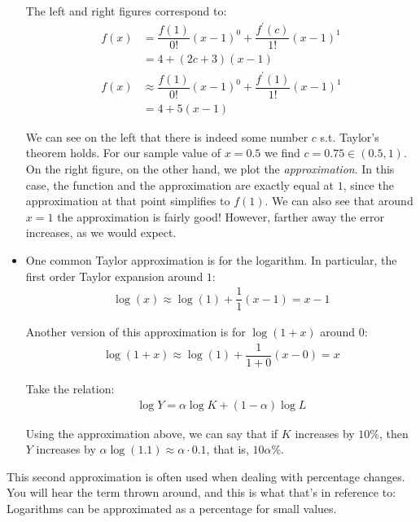 \documentclass{article}
\begin{document}
\begin{example}
\begin{itemize}[label=$\bullet$]
      The left and right figures correspond to:
      \begin{align*}
        f(x)
        & = \dfrac{f(1)}{0!} (x - 1)^0 + \dfrac{f^\prime(c)}{1!} (x - 1)^1
        \\
        & = 4 + (2c + 3) (x - 1)
        \\
        f(x)
        & \approx \dfrac{f(1)}{0!} (x - 1)^0 + \dfrac{f^\prime(1)}{1!} (x - 1)^1
        \\
        & = 4 + 5 (x - 1)
      \end{align*}

      We can see on the left that there is indeed some number $c$ s.t. Taylor's theorem holds. For our sample value of $x = 0.5$ we find $c = 0.75 \in (0.5, 1)$. On the right figure, on the other hand, we plot the \textit{approximation}. In this case, the function and the approximation are exactly equal at $1$, since the approximation at that point simplifies to $f(1)$. We can also see that around $x = 1$ the approximation is fairly good! However, farther away the error increases, as we would expect.

    \item One common Taylor approximation is for the logarithm. In particular, the first order Taylor expansion around  $1$:
      \begin{align*}
        \log(x) \approx \log(1) + \dfrac{1}{1} (x - 1) = x - 1
      \end{align*}

      Another version of this approximation is for $\log(1 + x)$ around $0$:
      \begin{align*}
        \log(1 + x) \approx \log(1) + \dfrac{1}{1 + 0} (x - 0) = x
      \end{align*}

      Take the relation:
      \begin{align*}
        \log Y = \alpha \log K + (1 - \alpha) \log L
      \end{align*}

      Using the approximation above, we can say that if $K$ increases by $10\%$, then $Y$ increases by $\alpha \log (1.1) \approx \alpha \cdot 0.1$, that is, $10\alpha \%$.
  \end{itemize}

  This second approximation is often used when dealing with percentage changes. You will hear the term   thrown around, and this is what that's in reference to: Logarithms can be approximated as a percentage for small values.
\end{example}
\end{document}
